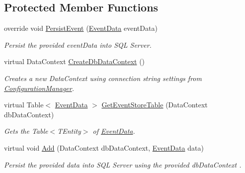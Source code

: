 \subsection*{Protected Member Functions}
\begin{DoxyCompactItemize}
\item 
override void \hyperlink{classCqrs_1_1Events_1_1SqlEventStore_a8d67570d50a97050cbce5a29d7a4b9f6_a8d67570d50a97050cbce5a29d7a4b9f6}{Persist\+Event} (\hyperlink{classCqrs_1_1Events_1_1EventData}{Event\+Data} event\+Data)
\begin{DoxyCompactList}\small\item\em Persist the provided {\itshape event\+Data}  into S\+QL Server. \end{DoxyCompactList}\item 
virtual Data\+Context \hyperlink{classCqrs_1_1Events_1_1SqlEventStore_a47a3fb01f9ccc65ec52ad96236cea3fb_a47a3fb01f9ccc65ec52ad96236cea3fb}{Create\+Db\+Data\+Context} ()
\begin{DoxyCompactList}\small\item\em Creates a new Data\+Context using connection string settings from \hyperlink{classCqrs_1_1Events_1_1SqlEventStore_ac74de2a6905b38d167bcb23055e19b3d_ac74de2a6905b38d167bcb23055e19b3d}{Configuration\+Manager}. \end{DoxyCompactList}\item 
virtual Table$<$ \hyperlink{classCqrs_1_1Events_1_1EventData}{Event\+Data} $>$ \hyperlink{classCqrs_1_1Events_1_1SqlEventStore_a6daa6c32874ab593d0d8a54c90d219c6_a6daa6c32874ab593d0d8a54c90d219c6}{Get\+Event\+Store\+Table} (Data\+Context db\+Data\+Context)
\begin{DoxyCompactList}\small\item\em Gets the Table$<$\+T\+Entity$>$ of \hyperlink{classCqrs_1_1Events_1_1EventData}{Event\+Data}. \end{DoxyCompactList}\item 
virtual void \hyperlink{classCqrs_1_1Events_1_1SqlEventStore_a94ce64c00db57e5b9dbd10f74a4cef5b_a94ce64c00db57e5b9dbd10f74a4cef5b}{Add} (Data\+Context db\+Data\+Context, \hyperlink{classCqrs_1_1Events_1_1EventData}{Event\+Data} data)
\begin{DoxyCompactList}\small\item\em Persist the provided {\itshape data}  into S\+QL Server using the provided {\itshape db\+Data\+Context} . \end{DoxyCompactList}\end{DoxyCompactItemize}
